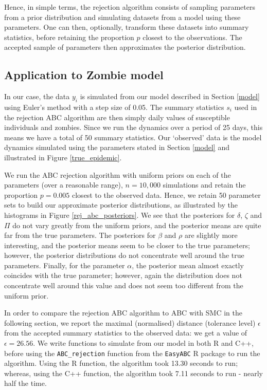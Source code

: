 \documentclass[]{article}
\begin{document}
\noindent Hence, in simple terms, the rejection algorithm consists of sampling parameters from a prior distribution and simulating datasets from a model using these parameters. One can then, optionally, transform these datasets into summary statistics, before retaining the proportion $p$ closest to the observations. The accepted sample of parameters then approximates the posterior distribution.

\subsection{Application to Zombie model}

In our case, the data $y_i$ is simulated from our model described in Section \ref{model} using Euler's method with a step size of 0.05. The summary statistics $s_i$ used in the rejection ABC algorithm are then simply daily values of susceptible individuals and zombies. Since we run the dynamics over a period of 25 days, this means we have a total of 50 summary statistics. Our `observed' data is the model dynamics simulated using the parameters stated in Section \ref{model} and illustrated in Figure \ref{true_epidemic}.

We run the ABC rejection algorithm with uniform priors on each of the parameters (over a reasonable range), $n=10,000$ simulations and retain the proportion $p=0.005$ closest to the observed data. Hence, we retain 50 parameter sets to build our approximate posterior distributions, as illustrated by the histograms in Figure \ref{rej_abc_posteriors}. We see that the posteriors for $\delta$, $\zeta$ and $\Pi$ do not vary greatly from the uniform priors, and the posterior means are quite far from the true parameters. The posteriors for $\beta$ and $\rho$ are slightly more interesting, and the posterior means seem to be closer to the true parameters; however, the posterior distributions do not concentrate well around the true parameters. Finally, for the parameter $\alpha$, the posterior mean almost exactly coincides with the true parameter; however, again the distribution does not concentrate well around this value and does not seem too different from the uniform prior.

In order to compare the rejection ABC algorithm to ABC with SMC in the following section, we report the maximal (normalised) distance (tolerance level) $\epsilon$ from the accepted summary statistics to the observed data: we get a value of $\epsilon = 26.56$. We write functions to simulate from our model in both R and C++, before using the \texttt{ABC\_rejection} function from the \texttt{EasyABC} R package to run the algorithm. Using the R function, the algorithm took 13.30 seconds to run; whereas, using the C++ function, the algorithm took 7.11 seconds to run - nearly half the time.
\end{document}
